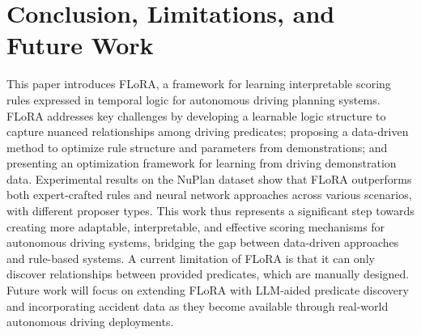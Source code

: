 \section{Conclusion, Limitations, and Future Work}

This paper introduces FLoRA, a framework for learning interpretable scoring rules expressed in temporal logic for autonomous driving planning systems. FLoRA addresses key challenges by developing a learnable logic structure to capture nuanced relationships among driving predicates; proposing a data-driven method to optimize rule structure and parameters from demonstrations; and presenting an optimization framework for learning from driving demonstration data. Experimental results on the NuPlan dataset show that FLoRA outperforms both expert-crafted rules and neural network approaches across various scenarios, with different proposer types. This work thus represents a significant step towards creating more adaptable, interpretable, and effective scoring mechanisms for autonomous driving systems, bridging the gap between data-driven approaches and rule-based systems. A current limitation of FLoRA is that it can only discover relationships between provided predicates, which are manually designed. Future work will focus on extending FLoRA with LLM-aided predicate discovery and incorporating accident data as they become available through real-world autonomous driving deployments.